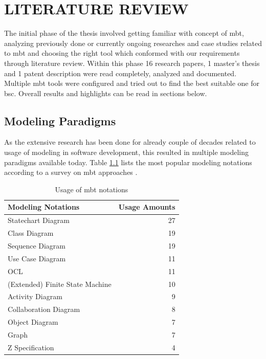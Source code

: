\chapter{LITERATURE REVIEW}
\label{chapter:literature_review}

\par
The initial phase of the thesis involved getting familiar with concept of \acrshort{mbt}, analyzing previously done or currently ongoing researches and case studies related to \acrshort{mbt} and choosing the right tool which conformed with our requirements through literature review. Within this phase 16 research papers, 1 master's thesis and 1 patent description were read completely, analyzed and documented. Multiple \acrshort{mbt} tools were configured and tried out to find the best suitable one for \acrshort{bsc}. Overall results and highlights can be read in sections below.

\section{Modeling Paradigms}

\par
As the extensive research has been done for already couple of decades related to usage of modeling in software development, this resulted in multiple modeling paradigms available today. Table \ref{tab:Usage_Survey} lists the most popular modeling notations according to a survey on \acrshort{mbt} approaches \cite{Survey}.

\begin{table}[]
    \centering
    \begin{tabular}{|l|r|}
        \hline
        \textbf{Modeling Notations} & \textbf{Usage Amounts} \\
        \hline
        Statechart Diagram & 27 \\
        \hline
        Class Diagram & 19 \\
        \hline
        Sequence Diagram & 19 \\
        \hline
        Use Case Diagram & 11 \\
        \hline
        OCL & 11 \\
        \hline
        (Extended) Finite State Machine & 10 \\
        \hline
        Activity Diagram & 9 \\
        \hline
        Collaboration Diagram & 8 \\
        \hline
        Object Diagram & 7 \\
        \hline
        Graph & 7 \\
        \hline
        Z Specification & 4 \\
        \hline
    \end{tabular}
    \caption{Usage of \acrshort{mbt} notations \cite{Survey}}
    \label{tab:Usage_Survey}
\end{table}

